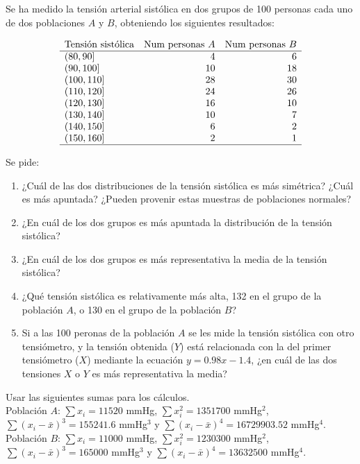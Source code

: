 
\begin{question}
Se ha medido la tensión arterial sistólica en dos grupos de 100 personas cada uno de dos poblaciones $A$ y $B$, obteniendo los siguientes resultados:

$$
\begin{array}{lrr}
 \mbox{Tensión sistólica} & \mbox{Num personas $A$} & \mbox{Num personas $B$} \\ 
  \hline
(80, 90] & 4 & 6 \\ 
  (90, 100] & 10 & 18 \\ 
  (100, 110] & 28 & 30 \\ 
  (110, 120] & 24 & 26 \\ 
  (120, 130] & 16 & 10 \\ 
  (130, 140] & 10 & 7 \\ 
  (140, 150] & 6 & 2 \\ 
  (150, 160] & 2 & 1 \\ 
   \hline
\end{array}$$

Se pide: 
\begin{enumerate}
\item ¿Cuál de las dos distribuciones de la tensión sistólica es más simétrica? ¿Cuál es más apuntada? ¿Pueden provenir estas muestras de poblaciones normales?
\item ¿En cuál de los dos grupos es más apuntada la distribución de la tensión sistólica?
\item ¿En cuál de los dos grupos es más representativa la media de la tensión sistólica?
\item ¿Qué tensión sistólica es relativamente más alta, 132 en el grupo de la población $A$, o 130 en el grupo de la población $B$?
\item Si a las 100 peronas de la población $A$ se les mide la tensión sistólica con otro tensiómetro, y la tensión obtenida ($Y$) está relacionada con la del primer tensiómetro ($X$) mediante la ecuación $y=0.98x-1.4$, ¿en cuál de las dos tensiones $X$ o $Y$ es más representativa la media?   
\end{enumerate}

Usar las siguientes sumas para los cálculos.\\
Población $A$: $\sum x_i=11520$ mmHg, $\sum x_i^2=1351700$ mmHg$^2$, $\sum (x_i-\bar x)^3=155241.6$ mmHg$^3$ y $\sum (x_i-\bar x)^4=16729903.52$ mmHg$^4$.\\
Población $B$: $\sum x_i=11000$ mmHg, $\sum x_i^2=1230300$ mmHg$^2$, $\sum (x_i-\bar x)^3=165000$ mmHg$^3$ y $\sum (x_i-\bar x)^4=13632500$ mmHg$^4$.
\end{question}


